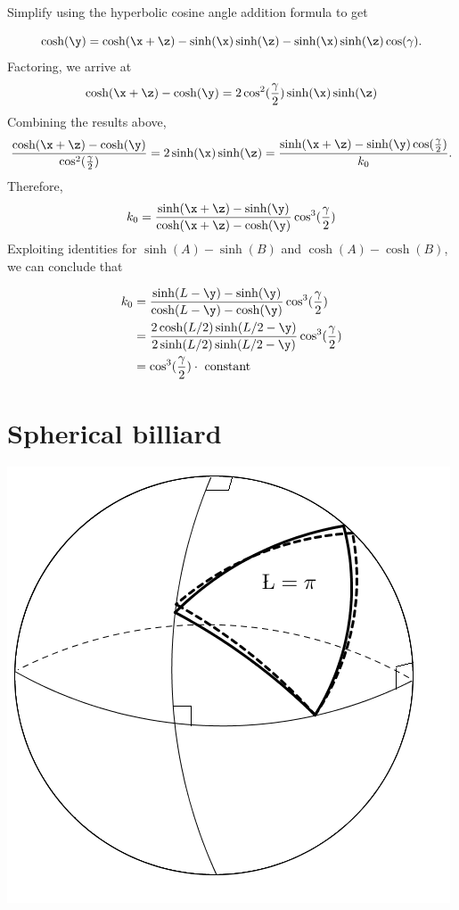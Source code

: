 \documentclass[11pt]{article}
\theoremstyle{plain}
\theoremstyle{definition}
\begin{document}
Simplify using the hyperbolic cosine angle addition formula to get

\begin{equation*}
\cosh(\y)=\cosh(\x+\z)-\sinh(\x)\sinh(\z)-\sinh(\x)\sinh(\z)\cos(\gamma).
\end{equation*}
Factoring, we arrive at
\begin{equation*}
\cosh(\x+\z)-\cosh(\y)=2 \cos^2(\frac{\gamma}{2})\sinh(\x)\sinh(\z)
\end{equation*}
Combining the results above,
\begin{equation*}
\frac{\cosh(\x+\z)-\cosh(\y)}{\cos^2(\frac{\gamma}{2})}=2\sinh(\x)\sinh(\z)=\frac{\sinh(\x+\z)-\sinh(\y)\cos(\frac{\gamma}{2})}{k_0}.
\end{equation*}
Therefore,
\begin{equation*}
k_0=\frac{\sinh(\x+\z)-\sinh(\y)}{\cosh(\x+\z)-\cosh(\y)}\cos^3(\frac{\gamma}{2})
\end{equation*}
Exploiting identities for $\sinh(A)-\sinh(B)$ and $\cosh(A)-\cosh(B)$, we can conclude that

\begin{equation*}\begin{split}
k_0&=\frac{\sinh(L-\y)-\sinh(\y)}{\cosh(L-\y)-\cosh(\y)}\cos^3(\frac{\gamma}{2}) \\
&=\frac{2\cosh(L/2)\sinh(L/2-\y)}{2\sinh(L/2)\sinh(L/2-\y)}\cos^3(\frac{\gamma}{2}) \\
&=\cos^3(\frac{\gamma}{2})\cdot\mbox{ constant}\end{split}
\end{equation*}


\section{Spherical billiard}
\begin{center}
    \includegraphics[width=.5\textwidth]{spherical.png}
 \end{center}
\end{document}

